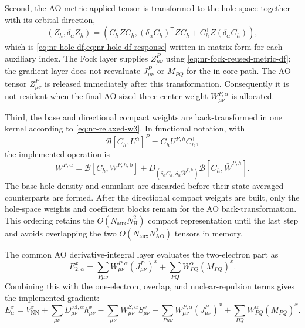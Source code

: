 \documentclass[aip,preprint,nofootinbib]{revtex4-1}
\begin{document}
Second, the AO metric-applied tensor is transformed to the hole space together
with its orbital direction,
\begin{equation}
 (Z_h,\delta_\alpha Z_h)
 =\left(C_h^{\mathsf T}ZC_h,
 (\delta_\alpha C_h)^{\mathsf T}ZC_h
 +C_h^{\mathsf T}Z(\delta_\alpha C_h)\right),
 \label{eq:nr-implemented-hole-transform}
\end{equation}
which is \cref{eq:nr-hole-df,eq:nr-hole-df-response} written in matrix form for
each auxiliary index.  The Fock layer supplies $Z^P_{\mu\nu}$ using
\cref{eq:nr-fock-reused-metric-df}; the gradient layer does not reevaluate
$J^P_{\mu\nu}$ or $M_{PQ}$ for the in-core path.  The AO tensor
$Z^P_{\mu\nu}$ is released immediately after this transformation.
Consequently it is not resident when the final AO-sized three-center weight
$W^{P,\alpha}_{\mu\nu}$ is allocated.

Third, the base and directional compact weights are back-transformed in one
kernel according to \cref{eq:nr-relaxed-w3}.  In functional notation, with
\begin{equation}
 \mathcal B[C_h,U^h]^P=C_hU^{P,h}C_h^{\mathsf T},
\end{equation}
the implemented operation is
\begin{equation}
 W^{P,\alpha}
 =\mathcal B[C_h,W^{P,h,\mathrm b}]
 +D_{(\delta_\alpha C_h,\delta_\alpha\bar W^{P,h})}
  \mathcal B[C_h,\bar W^{P,h}].
 \label{eq:nr-implemented-w3-backtransform}
\end{equation}
The base hole density and cumulant are discarded before their state-averaged
counterparts are formed.  After the directional compact weights are built,
only the hole-space weights and coefficient blocks remain for the AO
back-transformation.  This ordering retains the
$O(N_{\mathrm{aux}}N_{\mathrm H}^2)$ compact representation until the last
step and avoids overlapping the two
$O(N_{\mathrm{aux}}N_{\mathrm{AO}}^2)$ tensors in memory.

The common AO derivative-integral layer evaluates the two-electron part as
\begin{equation}
 E^x_{2,\alpha}
 =\sum_{P\mu\nu}W^{P,\alpha}_{\mu\nu}(J^P_{\mu\nu})^x
 +\sum_{PQ}W^\alpha_{PQ}(M_{PQ})^x.
 \label{eq:nr-df-gradient-driver}
\end{equation}
Combining this with the one-electron, overlap, and nuclear-repulsion terms
gives the implemented gradient:
\begin{equation}
 \boxed{
 E_\alpha^x
 =V_{\mathrm{NN}}^x
 +\sum_{\mu\nu}D^{\mathrm{rel},\alpha}_{\mu\nu}h^x_{\mu\nu}
 -\sum_{\mu\nu}W^{S,\alpha}_{\mu\nu}S^x_{\mu\nu}
 +\sum_{P\mu\nu}W^{P,\alpha}_{\mu\nu}(J^P_{\mu\nu})^x
 +\sum_{PQ}W^\alpha_{PQ}(M_{PQ})^x
 }.
 \label{eq:nr-final-gradient}
\end{equation}
\end{document}
